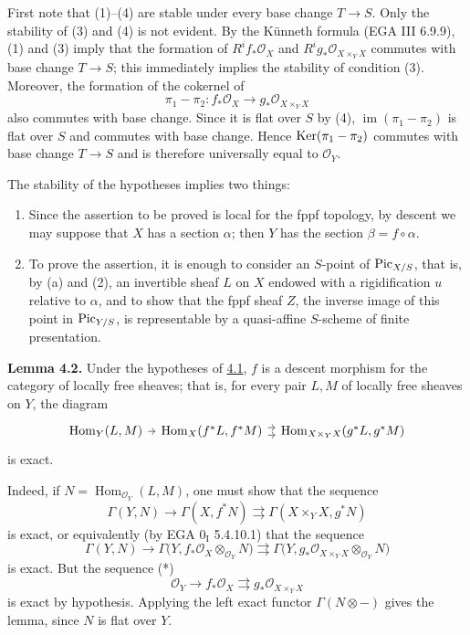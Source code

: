 First note that (1)--(4) are stable under every base change $T\to S$. Only
the stability of (3) and (4) is not evident. By the K\"unneth formula (EGA III
6.9.9), (1) and (3) imply that the formation of $R^if_*\mathcal O_X$ and
$R^ig_*\mathcal O_{X\times_YX}$ commutes with base change $T\to S$; this
immediately implies the stability of condition (3). Moreover, the formation
of the cokernel of
\[
  \pi_1-\pi_2:f_*\mathcal O_X
  \longrightarrow g_*\mathcal O_{X\times_YX}
\]
also commutes with base change. Since it is flat over $S$ by (4),
$\operatorname{im}(\pi_1-\pi_2)$ is flat over $S$ and commutes with base
change. Hence $\operatorname{Ker}(\pi_1-\pi_2)$ commutes with base change $T\to S$ and is
therefore universally equal to $\mathcal O_Y$.

The stability of the hypotheses implies two things:
\begin{enumerate}[label=\alph*.]
\item Since the assertion to be proved is local for the fppf topology, by
  descent we may suppose that $X$ has a section $\alpha$; then $Y$ has the
  section $\beta=f\circ\alpha$.
\item To prove the assertion, it is enough to consider an $S$-point of
  $\operatorname{Pic}_{X/S}$, that is, by (a) and (2), an invertible sheaf $L$ on $X$
  endowed with a rigidification $u$ relative to $\alpha$, and to show that
  the fppf sheaf $Z$, the inverse image of this point in $\operatorname{Pic}_{Y/S}$, is
  representable by a quasi-affine $S$-scheme of finite presentation.
\end{enumerate}

\textbf{Lemma 4.2.} Under the hypotheses of \hyperlink{sga6.e12.prop.4-1}{4.1}, $f$ is a descent morphism
for the category of locally free sheaves; that is, for every pair $L,M$ of
locally free sheaves on $Y$, the diagram
\[
\begin{tikzcd}[column sep=tiny]
\operatorname{Hom}_Y(L,M) \arrow[r] &
  \operatorname{Hom}_X(f^*L,f^*M)
    \arrow[r,shift left=.7ex] \arrow[r,shift right=.7ex] &
  \operatorname{Hom}_{X\times_YX}(g^*L,g^*M)
\end{tikzcd}
\]
is exact.

Indeed, if $N=\operatorname{Hom}_{\mathcal O_Y}(L,M)$, one must show that the sequence
\[
  \Gamma(Y,N)\longrightarrow\Gamma(X,f^*N)
  \rightrightarrows\Gamma(X\times_YX,g^*N)
\]
is exact, or equivalently (by EGA $0_{\mathrm I}$ 5.4.10.1) that the sequence
\[
  \Gamma(Y,N)
  \longrightarrow
  \Gamma\bigl(Y,f_*\mathcal O_X\otimes_{\mathcal O_Y}N\bigr)
  \rightrightarrows
  \Gamma\bigl(Y,g_*\mathcal O_{X\times_YX}
    \otimes_{\mathcal O_Y}N\bigr)
\]
is exact. But the sequence (*)
\[
  \mathcal O_Y\longrightarrow f_*\mathcal O_X
  \rightrightarrows g_*\mathcal O_{X\times_YX}
\]
is exact by hypothesis. Applying the left exact functor
$\Gamma(N\otimes -)$ gives the lemma, since $N$ is flat over $Y$.

